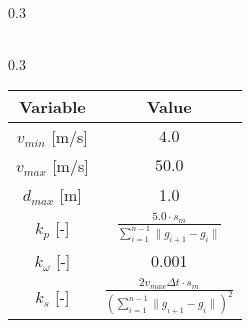 \begin{table*}[h]
\begin{subtable}[h]{0.3\textwidth}
\begin{tabular}{c|c}
             \hline
        \end{tabular}
        \label{subtable:slow_learning_phase}
    \end{subtable}
    \hfill
    \begin{subtable}[h]{0.3\textwidth}
            \centering
            \caption{Parameters of fast learning phase.}
            \begin{tabular}{c|c} 
                 \hline 
                 Variable & Value  \\ [0.1ex] 
                 \hline
                 \hline
                 $v_{min}$ [m/s] & $4.0$ \\ [0.2ex]
                 $v_{max}$ [m/s] & $50.0 $ \\ [0.2ex]
                 $d_{max}$ [m] & 1.0 \\ [0.2ex]
                 $k_p$ [-] & $\frac{5.0 \cdot s_m}{\sum_{i=1}^{n-1} \|g_{i+1} -g_i\|}$ \\ [0.2ex]
                 $k_\omega$ [-] & 0.001 \\ [0.2ex]
                 $k_s$ [-] & $\frac{2v_{max}\Delta t \cdot s_m }{\left(\sum_{i=1}^{n-1} \|g_{i+1} -g_i\|\right)^2}$ \\ [1.0ex]
                 
                 \hline
            \end{tabular}
            \label{subtable:fast_learning_phase}
        \end{subtable}
\label{table:parameters_learning_phase}
\end{table*}




